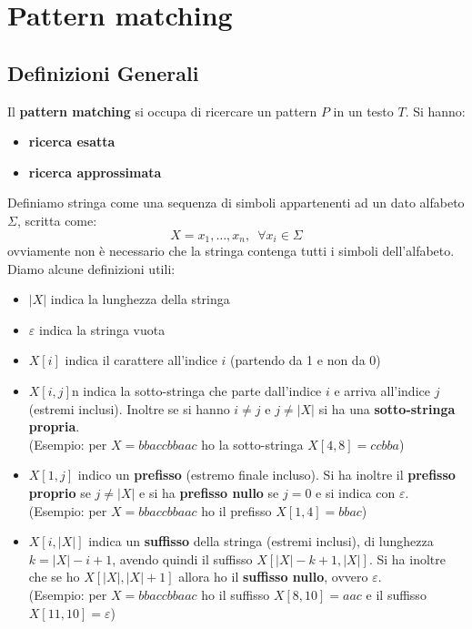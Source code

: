 \chapter{Pattern matching}
\section{Definizioni Generali}
Il \textbf{pattern matching} si occupa di ricercare un pattern $P$ in un testo
$T$. Si hanno:
\begin{itemize}
  \item \textbf{ricerca esatta}
  \item \textbf{ricerca approssimata}
\end{itemize}
\begin{definizione}
  Definiamo stringa come una sequenza di simboli appartenenti ad un dato
  alfabeto $\Sigma$, scritta come:
  \[X=x_1,\ldots,x_n,\,\,\,\forall x_i\in \Sigma\]
  ovviamente non è necessario che la stringa contenga tutti i simboli
  dell'alfabeto.\\
  Diamo alcune definizioni utili:
  \begin{itemize}
    \item $|X|$ indica la lunghezza della stringa
    \item $\varepsilon$ indica la stringa vuota
    \item $X[i]$ indica il carattere all'indice $i$ (partendo da 1 e non da 0)
    \item $X[i,j]$n indica la sotto-stringa che parte dall'indice $i$ e arriva
    all'indice $j$ (estremi inclusi). Inoltre se si hanno $i\neq j$ e $j\neq
    |X|$ si ha una \textbf{sotto-stringa propria}.\\
    (Esempio: per $X=bbaccbbaac$ ho la sotto-stringa $X[4,8]=ccbba$)
    \item $X[1,j]$ indico un \textbf{prefisso} (estremo finale incluso). Si ha
    inoltre il \textbf{prefisso proprio} se $j\neq |X|$ e si ha \textbf{prefisso
      nullo} se $j=0$ e si indica con $\varepsilon$.\\
    (Esempio: per $X=bbaccbbaac$ ho il prefisso $X[1,4]=bbac$)
    \item $X[i,|X|]$ indica un \textbf{suffisso} della stringa (estremi
    inclusi), di lunghezza $k=|X|-i+1$, avendo quindi il suffisso
    $X[|X|-k+1,|X|]$. Si ha inoltre che se ho $X[|X|,|X|+1]$ 
    allora ho il \textbf{suffisso nullo}, ovvero $\varepsilon$.\\
    (Esempio: per $X=bbaccbbaac$ ho il suffisso $X[8,10]=aac$ e il suffisso
    $X[11,10]=\varepsilon$)
    
\end{itemize} 
\end{definizione}
